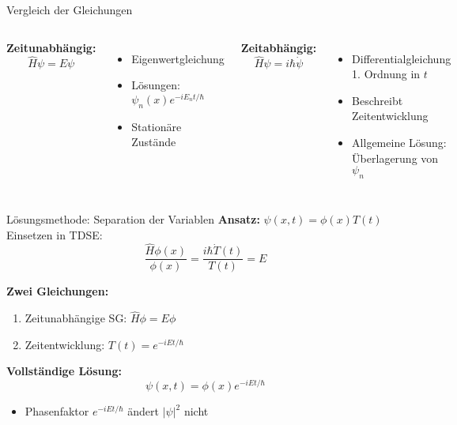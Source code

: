 \begin{frame}{Vergleich der Gleichungen}
    \begin{columns}
        \textbf{Zeitunabhängig:}
        \[
            \hat{H}\psi = E\psi
        \]
        \begin{itemize}
            \item Eigenwertgleichung
            \item Lösungen: $\psi_n(x)e^{-iE_n t/\hbar}$
            \item Stationäre Zustände
        \end{itemize}

        \textbf{Zeitabhängig:}
        \[
            \hat{H}\psi = i\hbar\dot{\psi}
        \]
        \begin{itemize}
            \item Differentialgleichung 1. Ordnung in $t$
            \item Beschreibt Zeitentwicklung
            \item Allgemeine Lösung: Überlagerung von $\psi_n$
        \end{itemize}
    \end{columns}
\end{frame}

\begin{frame}{Lösungsmethode: Separation der Variablen}
    \textbf{Ansatz:} $\psi(x,t) = \phi(x)T(t)$\\
    Einsetzen in TDSE:
    \[
        \frac{\hat{H}\phi(x)}{\phi(x)} = \frac{i\hbar \dot{T}(t)}{T(t)} = E
    \]

    \textbf{Zwei Gleichungen:}
    \begin{enumerate}
        \item Zeitunabhängige SG: $\hat{H}\phi = E\phi$
        \item Zeitentwicklung: $T(t) = e^{-iEt/\hbar}$
    \end{enumerate}

    \textbf{Vollständige Lösung:}
    \[
        \psi(x,t) = \phi(x)e^{-iEt/\hbar}
    \]
    \begin{itemize}
        \item Phasenfaktor $e^{-iEt/\hbar}$ ändert $|\psi|^2$ nicht
    \end{itemize}
\end{frame}

